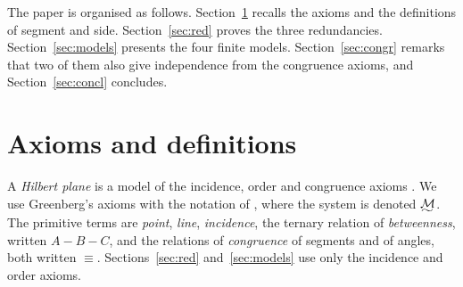\documentclass[11pt]{amsart}
\newcommand{\longsim}{\scalebox{1.3}[0.8]{\ensuremath{\sim}}}
\newcommand{\MG}{\underaccent{\longsim}{\mathcal{M}}}
\theoremstyle{definition}
\theoremstyle{remark}
\begin{document}
The paper is organised as follows. Section~\ref{sec:axioms} recalls the axioms and the definitions of segment and side. Section~\ref{sec:red} proves the three redundancies. Section~\ref{sec:models} presents the four finite models. Section~\ref{sec:congr} remarks that two of them also give independence from the congruence axioms, and Section~\ref{sec:concl} concludes.

\section{Axioms and definitions}\label{sec:axioms}

A \emph{Hilbert plane} is a model of the incidence, order and congruence axioms \cite[\S10]{Har}. We use Greenberg's axioms \cite[Chapters~2--3]{Gre} with the notation of \cite{Vol1}, where the system is denoted $\MG$. The primitive terms are \emph{point}, \emph{line}, \emph{incidence}, the ternary relation of \emph{betweenness}, written $A-B-C$, and the relations of \emph{congruence} of segments and of angles, both written $\equiv$. Sections~\ref{sec:red} and~\ref{sec:models} use only the incidence and order axioms.
\end{document}
